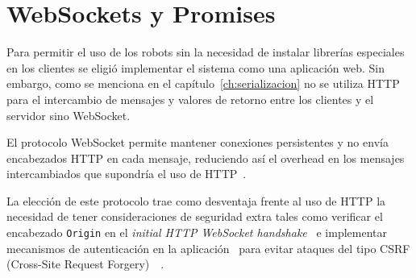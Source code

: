 
\chapter{WebSockets y Promises}
\label{ch:protocolo}

Para permitir el uso de los robots sin la necesidad de instalar librerías
especiales en los clientes se eligió implementar el sistema como una
aplicación web. Sin embargo, como se menciona en el
capítulo~\ref{ch:serializacion} no se utiliza HTTP para el intercambio de
mensajes y valores de retorno entre los clientes y el servidor sino
WebSocket.

El protocolo WebSocket permite mantener conexiones persistentes y no envía
encabezados HTTP en cada mensaje, reduciendo así el overhead en los mensajes
intercambiados que supondría el uso de HTTP~\cite{Wang}.

La elección de este protocolo trae como desventaja frente al uso de HTTP la
necesidad de tener consideraciones de seguridad extra tales como verificar
el encabezado \texttt{Origin} en el
\textit{initial HTTP WebSocket handshake}~\cite{Grigorik} e implementar
mecanismos de
autenticación en la aplicación~\cite{Wang} para evitar
ataques del tipo CSRF (Cross-Site Request
Forgery)~\cite{OWASP-2014}~\cite{Schneider-2013}.

